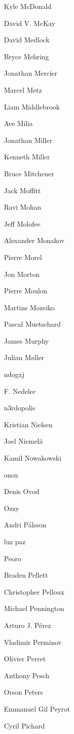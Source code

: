 \begin{DoxyItemize}
\item Kyle Mc\+Donald
\item David V. Mc\+Kay
\item David Medlock
\item Bryce Mehring
\item Jonathan Mercier
\item Marcel Metz
\item Liam Middlebrook
\item Ave Milia
\item Jonathan Miller
\item Kenneth Miller
\item Bruce Mitchener
\item Jack Moffitt
\item Ravi Mohan
\item Jeff Molofee
\item Alexander Monakov
\item Pierre Morel
\item Jon Morton
\item Pierre Moulon
\item Martins Mozeiko
\item Pascal Muetschard
\item James Murphy
\item Julian Møller
\item ndogxj
\item F. Nedelec
\item n3rdopolis
\item Kristian Nielsen
\item Joel Niemelä
\item Kamil Nowakowski
\item onox
\item Denis Ovod
\item Ozzy
\item Andri Pálsson
\item luz paz
\item Peoro
\item Braden Pellett
\item Christopher Pelloux
\item Michael Pennington
\item Arturo J. Pérez
\item Vladimir Perminov
\item Olivier Perret
\item Anthony Pesch
\item Orson Peters
\item Emmanuel Gil Peyrot
\item Cyril Pichard

\end{DoxyItemize}
